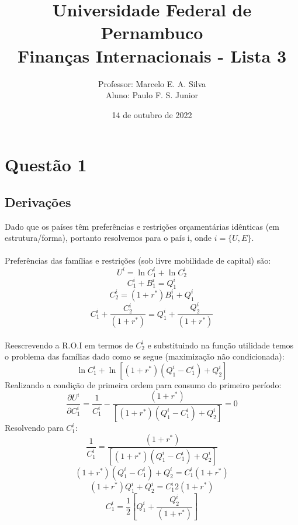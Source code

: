 \documentclass{article}
\title{Universidade Federal de Pernambuco \\
Finanças Internacionais - Lista 3}
\author{Professor: Marcelo E. A. Silva \\ Aluno: Paulo F. S. Junior}
\date{14 de outubro de 2022}
\begin{document}
\maketitle %


\section*{Questão 1}

\subsection*{Derivações}
Dado que os países têm preferências e restrições orçamentárias idênticas (em estrutura/forma), portanto resolvemos para o país i, onde $i=\{U, E\}$.
\\\\
Preferências das famílias e restrições (sob livre mobilidade de capital) são:
   $$U^{i}=\ln C_1^i + \ln C_2^i$$
   $$C_1^{i}+B_1^{i}=Q_1^{i}$$
   $$C_2^{i}=(1+r^*)B_1^{i}+Q_1^{i}$$
   $$C_1^{i}+\frac{C_2^{i}}{(1+r^*)}=Q_1^{i}+\frac{Q_2^{i}}{(1+r^*)}$$
\\
Reescrevendo a R.O.I em termos de $C_2^{i}$ e substituindo na função utilidade temos o problema das famílias dado como se segue (maximização não condicionada):
\begin{equation}
    \ln C_1^i + \ln[(1+r^*)(Q_1^{i}-C_1^{i})+Q_2^{i}]
\end{equation}
Realizando a condição de primeira ordem para consumo do primeiro período:
\begin{equation}
    \frac{\partial U^{i}}{\partial C_1^{i}} = \frac{1}{C_1^{i}}-\frac{(1+r^*)}{[(1+r^*)(Q_1^{i}-C_1^{i})+Q_2^{i}]} = 0
\end{equation}
Resolvendo para $C_1^{i}:$
\begin{equation}
    \frac{1}{C_1^{i}}=\frac{(1+r^*)}{[(1+r^*)(Q_1^{i}-C_1^{i})+Q_2^{i}]}
\end{equation}
\begin{equation}
    (1+r^*)(Q_1^{i}-C_1^{i})+Q_2^{i}=C_1^{i}(1+r^*)
\end{equation}
\begin{equation}
    (1+r^*)Q_1^{i}+Q_2^{i}=C_1^{i}2(1+r^*)
\end{equation}
\begin{equation}
    C_1^{i}=\frac{1}{2}\left[Q_1^{i}+\frac{Q_2^{i}}{(1+r^*)}\right]
\end{equation}
\end{document}

